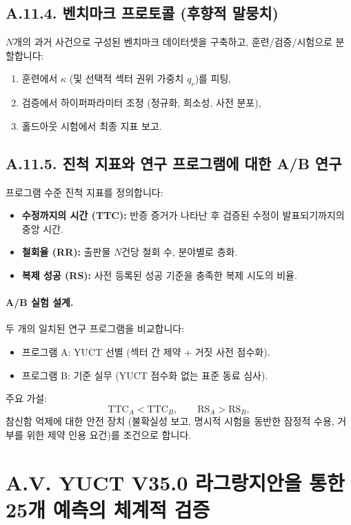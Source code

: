 \documentclass[13pt,a4paper]{article}
\begin{document}
	\subsection*{A.11.4. 벤치마크 프로토콜 (후향적 말뭉치)}
	$N$개의 과거 사건으로 구성된 벤치마크 데이터셋을 구축하고, 훈련/검증/시험으로 분할합니다:
	\begin{enumerate}[leftmargin=*]
		\item 훈련에서 $\kappa$ (및 선택적 섹터 권위 가중치 $q_r$)를 피팅,
		\item 검증에서 하이퍼파라미터 조정 (정규화, 희소성, 사전 분포),
		\item 홀드아웃 시험에서 최종 지표 보고.
	\end{enumerate}
	
	\subsection*{A.11.5. 진척 지표와 연구 프로그램에 대한 A/B 연구}
	프로그램 수준 진척 지표를 정의합니다:
	\begin{itemize}[leftmargin=*]
		\item \textbf{수정까지의 시간 (TTC):} 반증 증거가 나타난 후 검증된 수정이 발표되기까지의 중앙 시간.
		\item \textbf{철회율 (RR):} 출판물 $N$건당 철회 수, 분야별로 층화.
		\item \textbf{복제 성공 (RS):} 사전 등록된 성공 기준을 충족한 복제 시도의 비율.
	\end{itemize}
	
	\paragraph{A/B 실험 설계.}
	두 개의 일치된 연구 프로그램을 비교합니다:
	\begin{itemize}[leftmargin=*]
		\item 프로그램 A: YUCT 선별 (섹터 간 제약 + 거짓 사전 점수화).
		\item 프로그램 B: 기준 실무 (YUCT 점수화 없는 표준 동료 심사).
	\end{itemize}
	주요 가설:
	$$
	\mathrm{TTC}_A < \mathrm{TTC}_B,\qquad \mathrm{RS}_A > \mathrm{RS}_B,
	$$
	참신함 억제에 대한 안전 장치 (불확실성 보고, 명시적 시험을 동반한 잠정적 수용, 거부를 위한 제약 인용 요건)를 조건으로 합니다.
	
	\section*{A.V. YUCT V35.0 라그랑지안을 통한 25개 예측의 체계적 검증}
	
\end{document}
